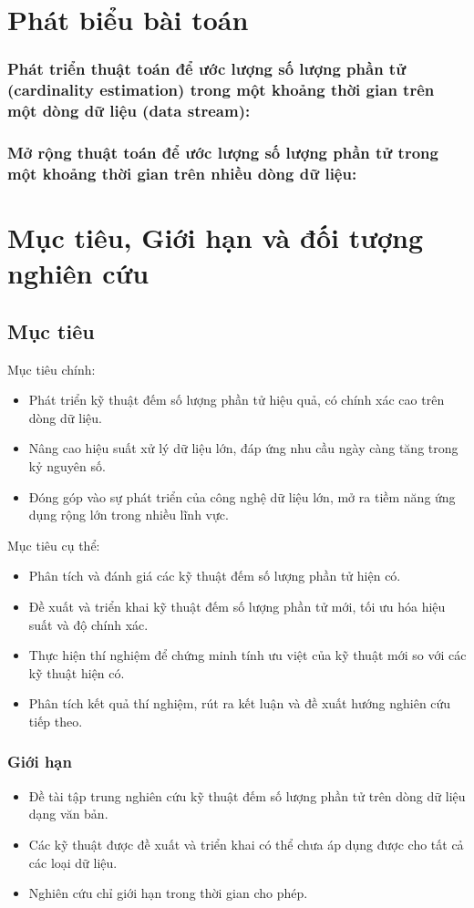 \documentclass[letterpaper,13pt]{article}
\theoremstyle{mytheor}
\begin{document}
\section{Phát biểu bài toán}
\subsubsection{Phát triển thuật toán để ước lượng số lượng phần tử (cardinality estimation) trong một khoảng thời gian trên một dòng dữ liệu (data stream):}
\subsubsection{Mở rộng thuật toán để ước lượng số lượng phần tử trong một khoảng thời gian trên nhiều dòng dữ liệu:}
\section{Mục tiêu, Giới hạn và đối tượng nghiên cứu }
\subsection{Mục tiêu}
Mục tiêu chính:
\begin{itemize}
    \item Phát triển kỹ thuật đếm số lượng phần tử hiệu quả, có chính xác cao trên dòng dữ liệu.
    \item Nâng cao hiệu suất xử lý dữ liệu lớn, đáp ứng nhu cầu ngày càng tăng trong kỷ nguyên số.
    \item Đóng góp vào sự phát triển của công nghệ dữ liệu lớn, mở ra tiềm năng ứng dụng rộng lớn trong nhiều lĩnh vực.
\end{itemize}
Mục tiêu cụ thể:
\begin{itemize}
    \item Phân tích và đánh giá các kỹ thuật đếm số lượng phần tử hiện có.
    \item Đề xuất và triển khai kỹ thuật đếm số lượng phần tử mới, tối ưu hóa hiệu suất và độ chính xác.
    \item Thực hiện thí nghiệm để chứng minh tính ưu việt của kỹ thuật mới so với các kỹ thuật hiện có.
    \item Phân tích kết quả thí nghiệm, rút ra kết luận và đề xuất hướng nghiên cứu tiếp theo.
\end{itemize}
\subsubsection{Giới hạn}
\begin{itemize}
    \item Đề tài tập trung nghiên cứu kỹ thuật đếm số lượng phần tử trên dòng dữ liệu dạng văn bản.
    \item Các kỹ thuật được đề xuất và triển khai có thể chưa áp dụng được cho tất cả các loại dữ liệu.
    \item Nghiên cứu chỉ giới hạn trong thời gian cho phép.
\end{itemize}
\end{document}
